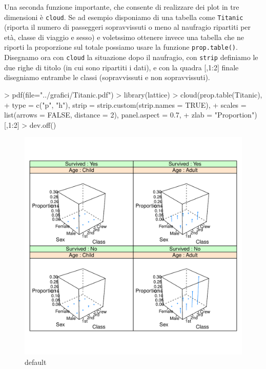 \documentclass[onecolumn,11pt]{book}
\begin{document}
 
Una seconda funzione importante, che consente di realizzare dei plot in tre dimensioni \`e \texttt{cloud}.  
Se ad esempio disponiamo di una tabella come \texttt{Titanic} (riporta il numero di passeggeri sopravvissuti o meno al naufragio ripartiti per et\`a, classe di viaggio e sesso) e voletssimo ottenere invece una tabella che ne riporti la proporzione  sul totale possiamo usare la funzione \texttt{prop.table()}.
Disegnamo ora con \texttt{cloud} la situazione dopo il naufragio, con 
\texttt{strip} definiamo le due righe di titolo (in cui sono ripartiti i dati), e con la quadra [,1:2]  finale disegniamo entrambe le classi (sopravvissuti e non sopravvissuti).
\begin{Schunk}
\begin{Sinput}
> pdf(file="../grafici/Titanic.pdf")
> library(lattice)
> cloud(prop.table(Titanic),
+ type = c("p", "h"), strip = strip.custom(strip.names = TRUE),
+ scales = list(arrows = FALSE, distance = 2), panel.aspect = 0.7,
+ zlab = "Proportion")[,1:2]
> dev.off()
\end{Sinput}
\end{Schunk}
\begin{figure}[htbp]
\begin{center}
\includegraphics[scale=0.8]{../grafici/Titanic.pdf}
\caption{default}
\label{default}
\end{center}
\end{figure}
\end{document}
